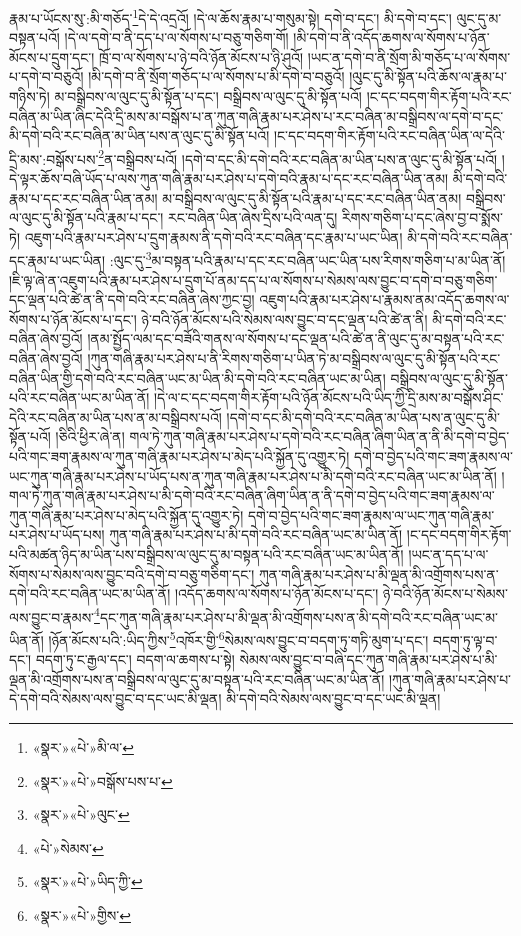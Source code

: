 རྣམ་པ་ཡོངས་སུ་:མི་གཅོད་\footnote{«སྣར་»«པེ་»མི་ལ་}དེ་དེ་འདྲའོ། །དེ་ལ་ཆོས་རྣམ་པ་གསུམ་སྟེ། དགེ་བ་དང་། མི་དགེ་བ་དང་། ལུང་དུ་མ་བསྟན་པའོ། །དེ་ལ་དགེ་བ་ནི་དད་པ་ལ་སོགས་པ་བཅུ་གཅིག་གོ། །མི་དགེ་བ་ནི་འདོད་ཆགས་ལ་སོགས་པ་ཉོན་མོངས་པ་དྲུག་དང་། ཁྲོ་བ་ལ་སོགས་པ་ཉེ་བའི་ཉོན་མོངས་པ་ཉི་ཤུའོ། །ཡང་ན་དགེ་བ་ནི་སྲོག་མི་གཅོད་པ་ལ་སོགས་པ་དགེ་བ་བཅུའོ། །མི་དགེ་བ་ནི་སྲོག་གཅོད་པ་ལ་སོགས་པ་མི་དགེ་བ་བཅུའོ། །ལུང་དུ་མི་སྟོན་པའི་ཆོས་ལ་རྣམ་པ་གཉིས་ཏེ། མ་བསྒྲིབས་ལ་ལུང་དུ་མི་སྟོན་པ་དང་། བསྒྲིབས་ལ་ལུང་དུ་མི་སྟོན་པའོ། །ང་དང་བདག་གིར་རྟོག་པའི་རང་བཞིན་མ་ཡིན་ཞིང་དེའི་དྲི་མས་མ་བསྒོས་པ་ན་ཀུན་གཞི་རྣམ་པར་ཤེས་པ་རང་བཞིན་མ་བསྒྲིབས་ལ་དགེ་བ་དང་མི་དགེ་བའི་རང་བཞིན་མ་ཡིན་པས་ན་ལུང་དུ་མི་སྟོན་པའོ། །ང་དང་བདག་གིར་རྟོག་པའི་རང་བཞིན་ཡིན་ལ་དེའི་དྲི་མས་:བསྒོས་པས་\footnote{«སྣར་»«པེ་»བསྒོས་པས་པ་}ན་བསྒྲིབས་པའོ། །དགེ་བ་དང་མི་དགེ་བའི་རང་བཞིན་མ་ཡིན་པས་ན་ལུང་དུ་མི་སྟོན་པའོ། །དེ་ལྟར་ཆོས་བཞི་ཡོད་པ་ལས་ཀུན་གཞི་རྣམ་པར་ཤེས་པ་དགེ་བའི་རྣམ་པ་དང་རང་བཞིན་ཡིན་ནམ། མི་དགེ་བའི་རྣམ་པ་དང་རང་བཞིན་ཡིན་ནམ། མ་བསྒྲིབས་ལ་ལུང་དུ་མི་སྟོན་པའི་རྣམ་པ་དང་རང་བཞིན་ཡིན་ནམ། བསྒྲིབས་ལ་ལུང་དུ་མི་སྟོན་པའི་རྣམ་པ་དང་། རང་བཞིན་ཡིན་ཞེས་དྲིས་པའི་ལན་དུ། རིགས་གཅིག་པ་དང་ཞེས་བྱ་བ་སྨོས་ཏེ། འཇུག་པའི་རྣམ་པར་ཤེས་པ་དྲུག་རྣམས་ནི་དགེ་བའི་རང་བཞིན་དང་རྣམ་པ་ཡང་ཡིན། མི་དགེ་བའི་རང་བཞིན་དང་རྣམ་པ་ཡང་ཡིན། :ལུང་དུ་\footnote{«སྣར་»«པེ་»ལུང་}མ་བསྟན་པའི་རྣམ་པ་དང་རང་བཞིན་ཡང་ཡིན་པས་རིགས་གཅིག་པ་མ་ཡིན་ནོ། །ཇི་ལྟ་ཞེ་ན་འཇུག་པའི་རྣམ་པར་ཤེས་པ་དྲུག་པོ་ནམ་དད་པ་ལ་སོགས་པ་སེམས་ལས་བྱུང་བ་དགེ་བ་བཅུ་གཅིག་དང་ལྡན་པའི་ཚེ་ན་ནི་དགེ་བའི་རང་བཞིན་ཞེས་ཀྱང་བྱ། འཇུག་པའི་རྣམ་པར་ཤེས་པ་རྣམས་ནམ་འདོད་ཆགས་ལ་སོགས་པ་ཉོན་མོངས་པ་དང་། ཉེ་བའི་ཉོན་མོངས་པའི་སེམས་ལས་བྱུང་བ་དང་ལྡན་པའི་ཚེ་ན་ནི། མི་དགེ་བའི་རང་བཞིན་ཞེས་བྱའོ། །ནམ་སྤྱོད་ལམ་དང་བཟོའི་གནས་ལ་སོགས་པ་དང་ལྡན་པའི་ཚེ་ན་ནི་ལུང་དུ་མ་བསྟན་པའི་རང་བཞིན་ཞེས་བྱའོ། །ཀུན་གཞི་རྣམ་པར་ཤེས་པ་ནི་རིགས་གཅིག་པ་ཡིན་ཏེ་མ་བསྒྲིབས་ལ་ལུང་དུ་མི་སྟོན་པའི་རང་བཞིན་ཡིན་གྱི་དགེ་བའི་རང་བཞིན་ཡང་མ་ཡིན་མི་དགེ་བའི་རང་བཞིན་ཡང་མ་ཡིན། བསྒྲིབས་ལ་ལུང་དུ་མི་སྟོན་པའི་རང་བཞིན་ཡང་མ་ཡིན་ནོ། །དེ་ལ་ང་དང་བདག་གིར་རྟོག་པའི་ཉོན་མོངས་པའི་ཡིད་ཀྱི་དྲི་མས་མ་བསྒོས་ཤིང་དེའི་རང་བཞིན་མ་ཡིན་པས་ན་མ་བསྒྲིབས་པའོ། །དགེ་བ་དང་མི་དགེ་བའི་རང་བཞིན་མ་ཡིན་པས་ན་ལུང་དུ་མི་སྟོན་པའོ། །ཅིའི་ཕྱིར་ཞེ་ན། གལ་ཏེ་ཀུན་གཞི་རྣམ་པར་ཤེས་པ་དགེ་བའི་རང་བཞིན་ཞིག་ཡིན་ན་ནི་མི་དགེ་བ་བྱེད་པའི་གང་ཟག་རྣམས་ལ་ཀུན་གཞི་རྣམ་པར་ཤེས་པ་མེད་པའི་སྐྱོན་དུ་འགྱུར་ཏེ། དགེ་བ་བྱེད་པའི་གང་ཟག་རྣམས་ལ་ཡང་ཀུན་གཞི་རྣམ་པར་ཤེས་པ་ཡོད་པས་ན་ཀུན་གཞི་རྣམ་པར་ཤེས་པ་མི་དགེ་བའི་རང་བཞིན་ཡང་མ་ཡིན་ནོ། །གལ་ཏེ་ཀུན་གཞི་རྣམ་པར་ཤེས་པ་མི་དགེ་བའི་རང་བཞིན་ཞིག་ཡིན་ན་ནི་དགེ་བ་བྱེད་པའི་གང་ཟག་རྣམས་ལ་ཀུན་གཞི་རྣམ་པར་ཤེས་པ་མེད་པའི་སྐྱོན་དུ་འགྱུར་ཏེ། དགེ་བ་བྱེད་པའི་གང་ཟག་རྣམས་ལ་ཡང་ཀུན་གཞི་རྣམ་པར་ཤེས་པ་ཡོད་པས། ཀུན་གཞི་རྣམ་པར་ཤེས་པ་མི་དགེ་བའི་རང་བཞིན་ཡང་མ་ཡིན་ནོ། །ང་དང་བདག་གིར་རྟོག་པའི་མཚན་ཉིད་མ་ཡིན་པས་བསྒྲིབས་ལ་ལུང་དུ་མ་བསྟན་པའི་རང་བཞིན་ཡང་མ་ཡིན་ནོ། །ཡང་ན་དད་པ་ལ་སོགས་པ་སེམས་ལས་བྱུང་བའི་དགེ་བ་བཅུ་གཅིག་དང་། ཀུན་གཞི་རྣམ་པར་ཤེས་པ་མི་ལྡན་མི་འགྲོགས་པས་ན་དགེ་བའི་རང་བཞིན་ཡང་མ་ཡིན་ནོ། །འདོད་ཆགས་ལ་སོགས་པ་ཉོན་མོངས་པ་དང་། ཉེ་བའི་ཉོན་མོངས་པ་སེམས་ལས་བྱུང་བ་རྣམས་\footnote{«པེ་»སེམས་}དང་ཀུན་གཞི་རྣམ་པར་ཤེས་པ་མི་ལྡན་མི་འགྲོགས་པས་ན་མི་དགེ་བའི་རང་བཞིན་ཡང་མ་ཡིན་ནོ། །ཉོན་མོངས་པའི་:ཡིད་ཀྱིས་\footnote{«སྣར་»«པེ་»ཡིད་ཀྱི་}འཁོར་གྱི་\footnote{«སྣར་»«པེ་»གྱིས་}སེམས་ལས་བྱུང་བ་བདག་ཏུ་གཏི་མུག་པ་དང་། བདག་ཏུ་ལྟ་བ་དང་། བདག་ཏུ་ང་རྒྱལ་དང་། བདག་ལ་ཆགས་པ་སྟེ། སེམས་ལས་བྱུང་བ་བཞི་དང་ཀུན་གཞི་རྣམ་པར་ཤེས་པ་མི་ལྡན་མི་འགྲོགས་པས་ན་བསྒྲིབས་ལ་ལུང་དུ་མ་བསྟན་པའི་རང་བཞིན་ཡང་མ་ཡིན་ནོ། །ཀུན་གཞི་རྣམ་པར་ཤེས་པ་དེ་དགེ་བའི་སེམས་ལས་བྱུང་བ་དང་ཡང་མི་ལྡན། མི་དགེ་བའི་སེམས་ལས་བྱུང་བ་དང་ཡང་མི་ལྡན། 
